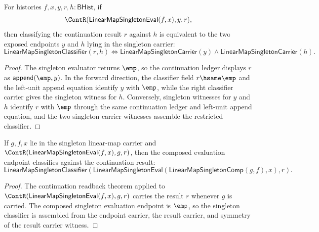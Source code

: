 \begin{theorem}
\label{thm:linearmap-singleton-eval-continuation-classifier}
For histories $f,x,y,r,h:\mathsf{BHist}$, if
$$
\ContR(\mathsf{LinearMapSingletonEval}(f,x),y,r),
$$
then classifying the continuation result $r$ against $h$ is equivalent to
the two exposed endpoints $y$ and $h$ lying in the singleton carrier:
$$
\mathsf{LinearMapSingletonClassifier}(r,h)
\Longleftrightarrow
\mathsf{LinearMapSingletonCarrier}(y)\land
\mathsf{LinearMapSingletonCarrier}(h).
$$
\end{theorem}
\begin{proof}
The singleton evaluator returns $\emp$, so the continuation ledger displays
$r$ as $\mathsf{append}(\emp,y)$. In the forward direction, the classifier
field $r\hsame\emp$ and the left-unit append equation identify $y$ with
$\emp$, while the right classifier carrier gives the singleton witness for
$h$. Conversely, singleton witnesses for $y$ and $h$ identify $r$ with
$\emp$ through the same continuation ledger and left-unit append equation,
and the two singleton carrier witnesses assemble the restricted classifier.
\end{proof}

\begin{theorem}
\label{thm:linearmap-singleton-eval-comp-continuation-classifier}
If $g,f,x$ lie in the singleton linear-map carrier and
$\ContR(\mathsf{LinearMapSingletonEval}(f,x),g,r)$, then the composed
evaluation endpoint classifies against the continuation result:
$$
\mathsf{LinearMapSingletonClassifier}
(\mathsf{LinearMapSingletonEval}(\mathsf{LinearMapSingletonComp}(g,f),x),r).
$$
\end{theorem}
\begin{proof}
The continuation readback theorem applied to
$\ContR(\mathsf{LinearMapSingletonEval}(f,x),g,r)$ carries the result $r$
whenever $g$ is carried. The composed singleton evaluation endpoint is
$\emp$, so the singleton classifier is assembled from the endpoint carrier,
the result carrier, and symmetry of the result carrier witness.
\end{proof}


